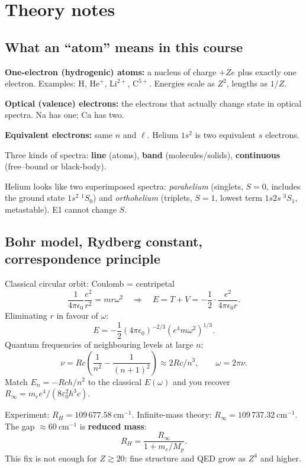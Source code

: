 \documentclass[11pt,a4paper]{article}
\begin{document}
\newpage
\section{Theory notes}

\subsection{What an ``atom'' means in this course}
\textbf{One-electron (hydrogenic) atoms:} a nucleus of charge \(+Ze\) plus exactly one electron.
Examples: H, \(\mathrm{He}^+\), \(\mathrm{Li}^{2+}\), \(\mathrm{C}^{5+}\). Energies scale as \(Z^2\), lengths as \(1/Z\).

\textbf{Optical (valence) electrons:} the electrons that actually change state in optical spectra. Na has one; Ca has two.

\textbf{Equivalent electrons:} same \(n\) and \(\ell\). Helium \(1s^2\) is two equivalent \(s\) electrons.

Three kinds of spectra: \textbf{line} (atoms), \textbf{band} (molecules/solids), \textbf{continuous} (free--bound or black-body).

Helium looks like two superimposed spectra: \emph{parahelium} (singlets, \(S=0\), includes the ground state \(1s^2\;{}^1S_0\)) and \emph{orthohelium} (triplets, \(S=1\), lowest term \(1s2s\;{}^3S_1\), metastable). E1 cannot change \(S\).

\subsection{Bohr model, Rydberg constant, correspondence principle}
Classical circular orbit: Coulomb = centripetal
\[
\frac{1}{4\pi\epsilon_0}\frac{e^2}{r^2}=m r\omega^2
\quad\Rightarrow\quad
E=T+V=-\frac12\cdot\frac{e^2}{4\pi\epsilon_0 r}.
\]
Eliminating \(r\) in favour of \(\omega\):
\[
E=-\frac12(4\pi\epsilon_0)^{-2/3}(e^4 m\omega^2)^{1/3}.
\]
Quantum frequencies of neighbouring levels at large \(n\):
\[
\nu=Rc\left(\frac{1}{n^2}-\frac{1}{(n+1)^2}\right)\approx 2Rc/n^3,\qquad\omega=2\pi\nu.
\]
Match \(E_n=-Rch/n^2\) to the classical \(E(\omega)\) and you recover \(R_\infty=m_e e^4/(8\varepsilon_0^2 h^3 c)\).

Experiment: \(R_H=109\,677.58~\mathrm{cm}^{-1}\). Infinite-mass theory: \(R_\infty=109\,737.32~\mathrm{cm}^{-1}\).
The gap \(\approx 60~\mathrm{cm}^{-1}\) is \textbf{reduced mass}:
\[
R_H=\frac{R_\infty}{1+m_e/M_p}.
\]
This fix is not enough for \(Z\gtrsim 20\): fine structure and QED grow as \(Z^4\) and higher.
\end{document}
